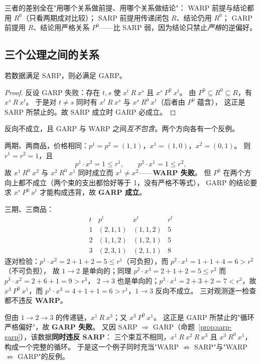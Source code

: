 三者的差别全在"用哪个关系做前提、用哪个关系做结论"：
WARP 前提与结论都用 $R^0$（只看两期成对比较）；
SARP 前提用传递闭包 $R$、结论仍用 $R^0$；
GARP 前提用 $R$、结论用严格关系 $P^0$——比 SARP 弱，因为结论只禁止\emph{严格}的逆偏好。

\subsection{三个公理之间的关系}

\begin{proposition}\label{prop:sarp-garp}
若数据满足 SARP，则必满足 GARP。
\end{proposition}

\begin{proof}
反设 GARP 失败：存在 $t,s$ 使 $x^t\ R\ x^s$ 且 $x^s\ P^0\ x^t$。
由 $P^0\subseteq R^0\subseteq R$，有 $x^s\ R\ x^t$。
于是对 $t\ne s$ 同时有 $x^t\ R\ x^s$ 与 $x^s\ R^0\ x^t$（后者由 $P^0$ 蕴含），
这正是 SARP 所禁止的。故 SARP 成立时 GARP 必成立。
\end{proof}

反向不成立，且 GARP 与 WARP 之间\emph{互不包含}。两个方向各有一个反例。

\begin{example}\label{ex:garp-not-warp}
两期、两商品，价格相同：$p^1=p^2=(1,1)$，$x^1=(1,0)$，$x^2=(0,1)$。
则 $r^1=r^2=1$，且
\[
 p^1\cdot x^2=1\le r^1,\qquad p^2\cdot x^1=1\le r^2,
\]
故 $x^1\ R^0\ x^2$ 与 $x^2\ R^0\ x^1$ 同时成立而 $x^1\ne x^2$——\textbf{WARP 失败}。
但 $P^0$ 在两个方向上都不成立（两个束的支出都恰好等于 1，没有严格不等式），
GARP 的结论要求 $x^s\ P^0\ x^t$ 才能构成违背，故 \textbf{GARP 成立}。
\end{example}

\begin{example}\label{ex:warp-not-garp}
三期、三商品：
\[
\begin{array}{c|ccc|c}
t & p^t & x^t & r^t\\
\hline
1 & (2,1,1) & (1,1,2) & 5\\
2 & (1,1,2) & (1,2,1) & 5\\
3 & (2,3,1) & (2,1,1) & 8
\end{array}
\]
逐对检验：$p^1\cdot x^2=2+1+2=5\le r^1$（可负担），而 $p^2\cdot x^1=1+1+4=6>r^2$（不可负担），
故 $1\to2$ 是单向的；同理 $p^2\cdot x^3=2+1+2=5\le r^2$ 而 $p^3\cdot x^2=2+6+1=9>r^3$，
$2\to3$ 也是单向的；$p^3\cdot x^1=2+3+2=7<r^3$，故 $x^3\ P^0\ x^1$，而
$p^1\cdot x^3=4+1+1=6>r^1$，$1\to3$ 反向不成立。
三对观测逐一检查都不违反 \textbf{WARP}。

但由 $1\to2\to3$ 的传递链，$x^1\ R\ x^3$；又 $x^3\ P^0\ x^1$。
这正是 GARP 所禁止的"循环严格偏好"，故 \textbf{GARP 失败}。
又因 SARP $\Rightarrow$ GARP（命题~\ref{prop:sarp-garp}），该数据\textbf{同时违反 SARP}：
三个束互不相同，$x^1\ R\ x^2\ R\ x^3$ 且 $x^3\ R^0\ x^1$，构成一个完整的循环。
于是这一个例子同时充当"WARP $\not\Rightarrow$ SARP"与"WARP $\not\Rightarrow$ GARP"的反例。
\end{example}

